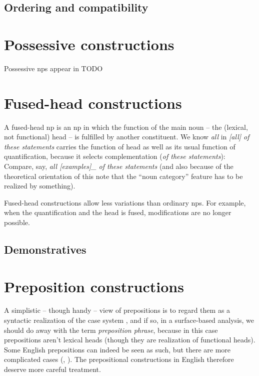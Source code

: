 \documentclass[UTF8, a4paper, oneside, scheme=plain]{ctexrep}
\newcommand*{\citepage}[1]{pp.~{#1}}
\newcommand*{\term}[1]{\emph{#1}}
\newcommand{\corpus}[1]{\emph{#1}}
\begin{document}
\subsection{Ordering and compatibility}

\section{Possessive constructions}

Possessive \acs{np}s appear in TODO

\section{Fused-head constructions}\label{sec:np.fused-head}

A fused-head \acs{np} is an \acs{np} in which the function of the main noun 
-- the (lexical, not functional) head -- 
is fulfilled by another constituent.
We know \corpus{all} in \corpus{[all] of these statements}
carries the function of head as well as its usual function of quantification,
because it selects complementation (\corpus{of these statements}):
Compare, say, \corpus{all [examples]_{} of these statements}
(and also because of the theoretical orientation of this note 
that the ``noun category'' feature has to be realized by something).

Fused-head constructions allow less variations than ordinary \acs{np}s.
For example, when the quantification and the head is fused,
modifications are no longer possible.

\subsection{Demonstratives}\label{sec:np.fused-head.dem}

\section{Preposition constructions}

A simplistic -- though handy -- view of prepositions 
is to regard them as a syntactic realization of the case system
\citep[\citepage{49}]{dixon2009basic1},
and if so,
in a surface-based analysis,
we should do away with the term \term{preposition phrase},
because in this case prepositions aren't lexical heads
(though they are realization of functional heads).
Some English prepositions can indeed be seen as such,
but there are more complicated cases 
(, ).
The prepositional constructions in English therefore deserve more careful treatment.
\end{document}
